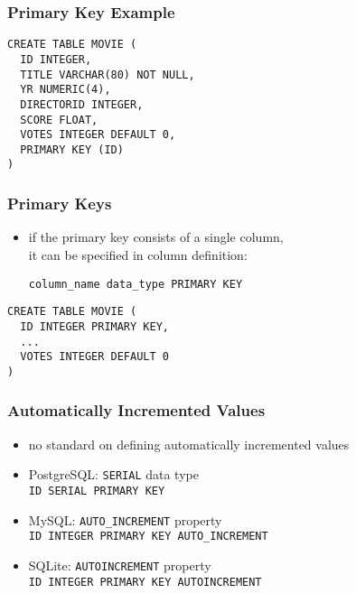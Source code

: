 \documentclass[dvipsnames]{beamer}
\theoremstyle{plain}
\begin{document}
\begin{frame}[fragile]
  \frametitle{Primary Key Example}

  \begin{lstlisting}
CREATE TABLE MOVIE (
  ID INTEGER,
  TITLE VARCHAR(80) NOT NULL,
  YR NUMERIC(4),
  DIRECTORID INTEGER,
  SCORE FLOAT,
  VOTES INTEGER DEFAULT 0,
  PRIMARY KEY (ID)
)
  \end{lstlisting}
\end{frame}

\begin{frame}[fragile]
  \frametitle{Primary Keys}

  \begin{itemize}
    \item if the primary key consists of a single column,\\
      it can be specified in column definition:
    \begin{lstlisting}
column_name data_type PRIMARY KEY
    \end{lstlisting}
  \end{itemize}

  \begin{example}
    \begin{lstlisting}
CREATE TABLE MOVIE (
  ID INTEGER PRIMARY KEY,
  ...
  VOTES INTEGER DEFAULT 0
)
    \end{lstlisting}
  \end{example}
\end{frame}

\begin{frame}[fragile]
  \frametitle{Automatically Incremented Values}

  \begin{itemize}
    \item no standard on defining automatically incremented values

    \bigskip
    \item PostgreSQL: \texttt{SERIAL} data type\\
      \lstinline!ID SERIAL PRIMARY KEY!

    \smallskip
    \item MySQL: \texttt{AUTO\_INCREMENT} property\\
      \lstinline!ID INTEGER PRIMARY KEY AUTO_INCREMENT!

    \smallskip
    \item SQLite: \texttt{AUTOINCREMENT} property\\
      \lstinline!ID INTEGER PRIMARY KEY AUTOINCREMENT!
  \end{itemize}
\end{frame}
\end{document}
